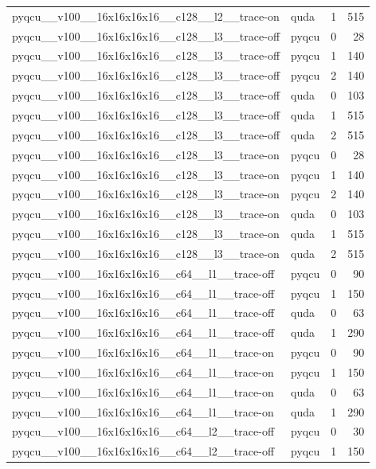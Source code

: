 \begin{table}[htbp]
\begin{tabular}{@{}llrr@{}}
pyqcu\_\_v100\_\_16x16x16x16\_\_c128\_\_l2\_\_trace-on & quda & 1 & 515 \\
pyqcu\_\_v100\_\_16x16x16x16\_\_c128\_\_l3\_\_trace-off & pyqcu & 0 & 28 \\
pyqcu\_\_v100\_\_16x16x16x16\_\_c128\_\_l3\_\_trace-off & pyqcu & 1 & 140 \\
pyqcu\_\_v100\_\_16x16x16x16\_\_c128\_\_l3\_\_trace-off & pyqcu & 2 & 140 \\
pyqcu\_\_v100\_\_16x16x16x16\_\_c128\_\_l3\_\_trace-off & quda & 0 & 103 \\
pyqcu\_\_v100\_\_16x16x16x16\_\_c128\_\_l3\_\_trace-off & quda & 1 & 515 \\
pyqcu\_\_v100\_\_16x16x16x16\_\_c128\_\_l3\_\_trace-off & quda & 2 & 515 \\
pyqcu\_\_v100\_\_16x16x16x16\_\_c128\_\_l3\_\_trace-on & pyqcu & 0 & 28 \\
pyqcu\_\_v100\_\_16x16x16x16\_\_c128\_\_l3\_\_trace-on & pyqcu & 1 & 140 \\
pyqcu\_\_v100\_\_16x16x16x16\_\_c128\_\_l3\_\_trace-on & pyqcu & 2 & 140 \\
pyqcu\_\_v100\_\_16x16x16x16\_\_c128\_\_l3\_\_trace-on & quda & 0 & 103 \\
pyqcu\_\_v100\_\_16x16x16x16\_\_c128\_\_l3\_\_trace-on & quda & 1 & 515 \\
pyqcu\_\_v100\_\_16x16x16x16\_\_c128\_\_l3\_\_trace-on & quda & 2 & 515 \\
pyqcu\_\_v100\_\_16x16x16x16\_\_c64\_\_l1\_\_trace-off & pyqcu & 0 & 90 \\
pyqcu\_\_v100\_\_16x16x16x16\_\_c64\_\_l1\_\_trace-off & pyqcu & 1 & 150 \\
pyqcu\_\_v100\_\_16x16x16x16\_\_c64\_\_l1\_\_trace-off & quda & 0 & 63 \\
pyqcu\_\_v100\_\_16x16x16x16\_\_c64\_\_l1\_\_trace-off & quda & 1 & 290 \\
pyqcu\_\_v100\_\_16x16x16x16\_\_c64\_\_l1\_\_trace-on & pyqcu & 0 & 90 \\
pyqcu\_\_v100\_\_16x16x16x16\_\_c64\_\_l1\_\_trace-on & pyqcu & 1 & 150 \\
pyqcu\_\_v100\_\_16x16x16x16\_\_c64\_\_l1\_\_trace-on & quda & 0 & 63 \\
pyqcu\_\_v100\_\_16x16x16x16\_\_c64\_\_l1\_\_trace-on & quda & 1 & 290 \\
pyqcu\_\_v100\_\_16x16x16x16\_\_c64\_\_l2\_\_trace-off & pyqcu & 0 & 30 \\
pyqcu\_\_v100\_\_16x16x16x16\_\_c64\_\_l2\_\_trace-off & pyqcu & 1 & 150 \\

\end{tabular}
\end{table}
